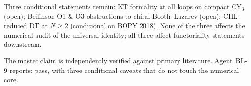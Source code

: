 \documentclass[11pt]{article}
\theoremstyle{definition}
\begin{document}
Three conditional statements remain: KT formality at all loops on
compact CY$_3$ (open); Beilinson O1 \& O3 obstructions to chiral
Booth--Lazarev (open); CHL-reduced DT at $N \geq 2$ (conditional on
BOPY 2018). None of the three affects the numerical audit of the
universal identity; all three affect functoriality statements
downstream.

The master claim is independently verified against primary literature.
Agent~BL-9 reports: pass, with three conditional caveats that do not
touch the numerical core.
\end{document}

